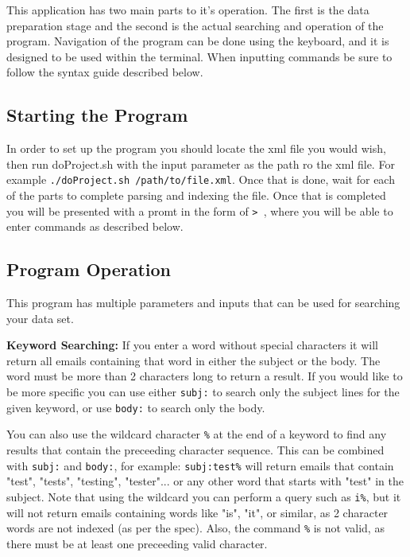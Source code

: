 This application has two main parts to it's operation.  The first is the data preparation stage
and the second is the actual searching and operation of the program.  Navigation of the program
can be done using the keyboard, and it is designed to be used within the terminal.  When 
inputting commands be sure to follow the syntax guide described below. 

\subsection{Starting the Program}
In order to set up the program you should locate the xml file you would wish, then run doProject.sh
with the input parameter as the path ro the xml file.  For example 
\verb|./doProject.sh /path/to/file.xml|.  Once that is done, wait for each of the parts to complete
parsing and indexing the file.  Once that is completed you will be presented with a promt in the 
form of \verb|> |, where you will be able to enter commands as described below.  

\subsection{Program Operation}
This program has multiple parameters and inputs that can be used for searching your data set.

\textbf{Keyword Searching: }
If you enter a word without special characters it will return all emails containing that word
in either the subject or the body.  The word must be more than 2 characters long to return a 
result.  If you would like to be more specific you can use either \verb|subj:| to search only
the subject lines for the given keyword, or use \verb|body:| to search only the body.  

You can also use the wildcard character \verb|%| at the end of a keyword to find any results that 
contain the preceeding character sequence.  This can be combined with \verb|subj:| and 
\verb|body:|, for example: \verb|subj:test%| will return emails that contain "test", "tests", 
"testing", "tester"... or any other word that starts with "test" in the subject.  Note that 
using the wildcard you can perform a query such as \verb|i%|, but it will not return emails 
containing words like "is", "it", or similar, as 2 character words are not indexed (as per the 
spec).  Also, the command \verb|%| is not valid, as there must be at least one preceeding valid 
character.  

